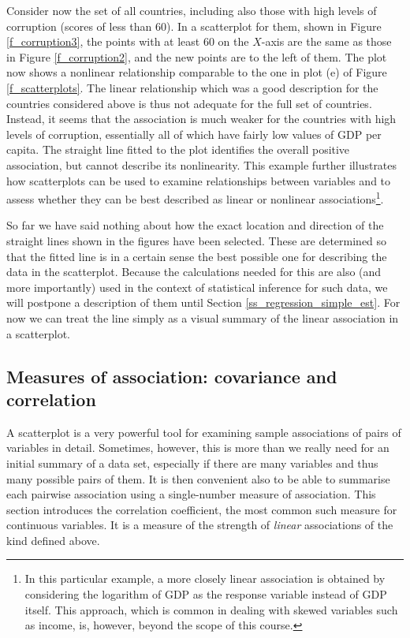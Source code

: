 Consider now the set of all countries, including also those with
high levels of corruption (scores of less than 60). In a scatterplot for
them,  shown in Figure \ref{f_corruption3}, the points with at least 60
on the $X$-axis are the same as those in Figure \ref{f_corruption2}, and
the new points are to the left of them. The plot now shows a
nonlinear relationship comparable to the one in
plot (e) of Figure \ref{f_scatterplots}. The linear relationship which
was a good description for the countries considered above is thus not
adequate for the full set of countries. Instead, it seems that the
association is much weaker for the countries with high levels of
corruption, essentially all of which have fairly low values of GDP per
capita. The straight line fitted to the plot identifies the overall
positive association, but cannot describe its nonlinearity. This example
further illustrates how scatterplots can be used to examine
relationships between variables and to assess whether they can be best
described as linear or nonlinear associations\footnote{In this
particular example, a more closely linear association is obtained by
considering the logarithm of GDP as the response variable instead of GDP
itself. This approach, which is common in dealing with skewed variables
such as income, is, however, beyond the scope of this course.}.

So far we have said nothing about how the exact location and
direction of the straight lines shown in the figures have been selected.
These are determined so that the fitted line is in a certain
sense the best possible one for describing the data in the scatterplot.
Because the calculations needed for this are also (and more importantly)
used in the context of statistical inference for such
data, we will postpone a description of them until Section
\ref{ss_regression_simple_est}. For now we can treat the line simply as
a visual summary of the linear association in a scatterplot.

\subsection{Measures of association: covariance and correlation}
\label{ss_regression_descr_corr}

A scatterplot is a very powerful tool for examining sample associations
of pairs of variables in detail. Sometimes, however, this is more than
we really need for an initial summary of a data set, especially if there
are many variables and thus many possible pairs of them. It is then
convenient also to be able to summarise each pairwise association using
a single-number measure of association. This section introduces the
correlation coefficient, the most common such measure for continuous
variables. It is a measure of the strength of \emph{linear} associations
of the kind defined above.

